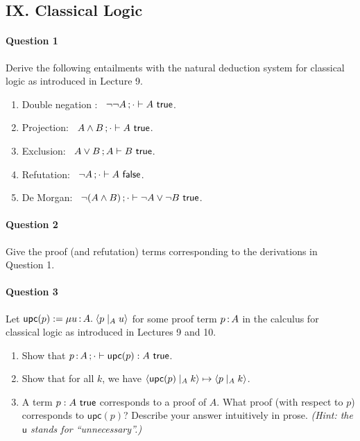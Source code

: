 \documentclass[11pt,a4paper,twoside]{article}
\begin{document}
\subsection*{IX. Classical Logic}

\paragraph{Question 1} Derive the following entailments with the
natural deduction system for classical logic as introduced in Lecture 9.

\begin{enumerate}[label=(\alph*)]
  \item Double negation : \ $\neg\neg A \, ; \cdot \vdash A\ \mathsf{true}$.

  \item Projection: \ $A \land B \, ; \cdot \vdash A\ \mathsf{true}$.

  \item Exclusion: \ $A \lor B \, ; A \vdash B\ \mathsf{true} $.

  \item Refutation: \ $\neg A \, ; \cdot \vdash A\ \mathsf{false}$.

  \item De Morgan: \ $\neg(A \land B) \, ; \cdot \vdash \neg A
    \lor \neg B\ \mathsf{true}$.
\end{enumerate}

\paragraph{Question 2} Give the proof (and refutation) terms
corresponding to the derivations in Question 1.

\paragraph{Question 3} Let $\mathsf{upc}(p) :=
\mu u \,{:}\, A .\; \langle p \mid_{A} u \rangle$ for some proof term $p \,{:}\, A$ in
the calculus for classical logic as introduced in Lectures 9 and 10.

\begin{enumerate}[label=(\alph*)]
  \item Show that $p \,{:}\, A \, ; \cdot \vdash \mathsf{upc}(p)
    : A\ \mathsf{true}$.

  \item Show that for all $k$, we have
    $\langle \mathsf{upc}(p) \mid_{A} k \rangle \mapsto \langle p \mid_{A} k \rangle$.

  \item A term $p : A\ \mathsf{true}$ corresponds to a proof of $A$.
    What proof (with respect to $p$) corresponds to $\mathsf{upc}(p)$?
    Describe your answer intuitively in prose.
    \emph{(Hint: the $\mathsf{u}$ stands for ``unnecessary''.)}
\end{enumerate}
\end{document}
